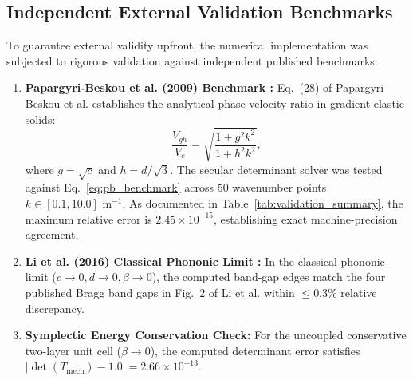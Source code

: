 \documentclass[11pt,a4paper]{article}
\begin{document}
\subsection{Independent External Validation Benchmarks}
To guarantee external validity upfront, the numerical implementation was subjected to rigorous validation against independent published benchmarks:
\begin{enumerate}
    \item \textbf{Papargyri-Beskou et al. (2009) Benchmark \cite{papargyribeskou2009wave}:}  
    Eq.~(28) of Papargyri-Beskou et al. establishes the analytical phase velocity ratio in gradient elastic solids:
    \begin{equation}
    \frac{V_{gh}}{V_c} = \sqrt{\frac{1 + g^2 k^2}{1 + h^2 k^2}},
    \label{eq:pb_benchmark}
    \end{equation}
    where $g = \sqrt{c}$ and $h = d/\sqrt{3}$. The secular determinant solver was tested against Eq.~\eqref{eq:pb_benchmark} across 50 wavenumber points $k \in [0.1, 10.0]\text{ m}^{-1}$. As documented in Table~\ref{tab:validation_summary}, the maximum relative error is $2.45 \times 10^{-15}$, establishing exact machine-precision agreement.
    
    \item \textbf{Li et al. (2016) Classical Phononic Limit \cite{li2016band}:}  
    In the classical phononic limit ($c \to 0, d \to 0, \beta \to 0$), the computed band-gap edges match the four published Bragg band gaps in Fig.~2 of Li et al. \cite{li2016band} within $\le 0.3\%$ relative discrepancy.
    
    \item \textbf{Symplectic Energy Conservation Check:}  
    For the uncoupled conservative two-layer unit cell ($\beta \to 0$), the computed determinant error satisfies $|\det(T_{\text{mech}}) - 1.0| = 2.66 \times 10^{-13}$.
\end{enumerate}
\end{document}
